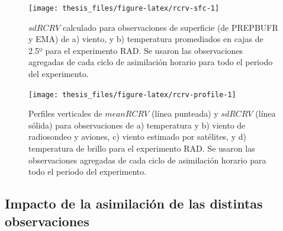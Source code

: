 \documentclass[12pt,oneside,a4paper]{reedthesis}
\begin{document}
\begin{figure}
\texttt{[image: thesis\_files/figure-latex/rcrv-sfc-1]} \caption{\(sd RCRV\) calculado para observaciones de superficie (de PREPBUFR y EMA) de a) viento, y b) temperatura promediados en cajas de 2.5º para el experimento RAD. Se usaron las observaciones agregadas de cada ciclo de asimilación horario para todo el periodo del experimento.}\label{fig:rcrv-sfc}
\end{figure}

\begin{figure}
\texttt{[image: thesis\_files/figure-latex/rcrv-profile-1]} \caption{Perfiles verticales de \(mean RCRV\) (línea punteada) y \(sd RCRV\) (línea sólida) para observaciones de a) temperatura y b) viento de radiosondeo y aviones, c) viento estimado por satélites, y d) temperatura de brillo para el experimento RAD. Se usaron las observaciones agregadas de cada ciclo de asimilación horario para todo el periodo del experimento.}\label{fig:rcrv-profile}
\end{figure}
\hypertarget{impacto-analisis}{%
\subsection{Impacto de la asimilación de las distintas observaciones}\label{impacto-analisis}}
\end{document}
